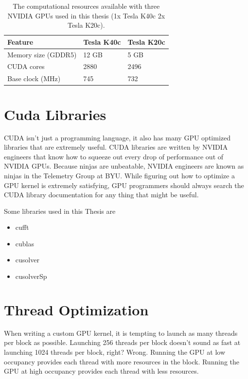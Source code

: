 \begin{table}
\begin{center}
\begin{tabular}{lll}
	\toprule
	Feature 			& Tesla K40c 	& Tesla K20c 	\\ \midrule
	Memory size (GDDR5) & 12 GB 		& 5 GB 			\\
	CUDA cores 			& 2880 			& 2496 			\\
	Base clock (MHz) 	& 745 			& 732 			\\ \bottomrule
\end{tabular}
\end{center}
\caption{The computational resources available with three NVIDIA GPUs used in this thesis (1x Tesla K40c 2x Tesla K20c).}
\label{tab:gpu-resources_jeffs}
\end{table}

\section{Cuda Libraries}
CUDA isn't just a programming language, it also has many GPU optimized libraries that are extremely useful.
CUDA libraries are written by NVIDIA engineers that know how to squeeze out every drop of performance out of NVIDIA GPUs.
Because ninjas are unbeatable, NVIDIA engineers are known as ninjas in the Telemetry Group at BYU.
While figuring out how to optimize a GPU kernel is extremely satisfying, GPU programmers should always search the CUDA library documentation for any thing that might be useful.

Some libraries used in this Thesis are
\begin{itemize}
  \item cufft
  \item cublas
  \item cusolver
  \item cusolverSp
\end{itemize}

\section{Thread Optimization}
When writing a custom GPU kernel, it is tempting to launch as many threads per block as possible.
Launching 256 threads per block doesn't sound as fast at launching 1024 threads per block, right?
Wrong. Running the GPU at low occupancy provides each thread with more resources in the block.
Running the GPU at high occupancy provides each thread with less resources.

